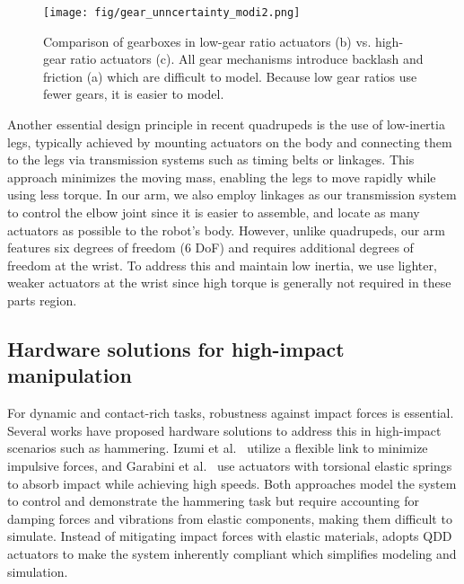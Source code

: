 \begin{figure}[ht]
\centering
\texttt{[image: fig/gear\_unncertainty\_modi2.png]}
\caption{Comparison of gearboxes in low-gear ratio actuators (b) vs. high-gear ratio actuators (c).  All gear mechanisms introduce backlash and friction (a) which are difficult to model. Because low gear ratios use fewer gears, it is easier to model.}
\label{fig:gear_uncertainty}
\end{figure}

Another essential design principle in recent quadrupeds is the use of low-inertia legs, typically achieved by mounting actuators on the body and connecting them to the legs via transmission systems such as timing belts or linkages. This approach minimizes the moving mass, enabling the legs to move rapidly while using less torque. In our arm, we also employ linkages as our transmission system to control the elbow joint since it is easier to assemble, and locate as many actuators as possible to the robot's body. However, unlike quadrupeds, our arm features six degrees of freedom (6 DoF) and requires additional degrees of freedom at the wrist. To address this and maintain low inertia, we use lighter, weaker actuators at the wrist since high torque is generally not required in these parts region.


\subsection{Hardware solutions for high-impact manipulation}

For dynamic and contact-rich tasks, robustness against impact forces is essential. Several works have proposed hardware solutions to address this in high-impact scenarios such as hammering. Izumi et al.~\cite{izumi1993control} utilize a flexible link to minimize impulsive forces, and Garabini et al.~\cite{garabini2011optimality} use actuators with torsional elastic springs to absorb impact while achieving high speeds. 
Both approaches model the system to control and demonstrate the hammering task but require accounting for damping forces and vibrations from elastic components, making them difficult to simulate.
Instead of mitigating impact forces with elastic materials, \robot adopts QDD actuators to make the system inherently compliant which simplifies modeling and simulation.

